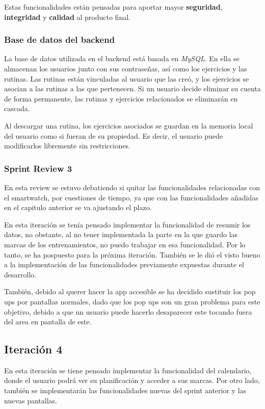 Estas funcionalidades est\'an pensadas para aportar mayor \textbf{seguridad}, \textbf{integridad} y \textbf{calidad} al producto final.

\subsubsection{Base de datos del backend}
La base de datos utilizada en el backend está basada en \textit{MySQL}. En ella se almacenan los usuarios junto con sus contraseñas, así como los ejercicios y las rutinas. Las rutinas están vinculadas al usuario que las creó, y los ejercicios se asocian a las rutinas a las que pertenecen. Si un usuario decide eliminar su cuenta de forma permanente, las rutinas y ejercicios relacionados se eliminarán en cascada.

Al descargar una rutina, los ejercicios asociados se guardan en la memoria local del usuario como si fueran de su propiedad. Es decir, el usuario puede modificarlos libremente sin restricciones.

\subsubsection{Sprint Review 3}

En esta review se estuvo debatiendo si quitar las funcionalidades relacionadas con el smartwatch, por cuestiones de tiempo, ya que con las funcionalidades añadidas en el capitulo anterior se va ajustando el plazo.

En esta iteración se tenía pensado implementar la funcionalidad de resumir los datos, no obstante, al no tener implementada la parte en la que guardo las marcas de los entrenamientos, no puedo trabajar en esa funcionalidad. Por lo tanto, se ha pospuesto para la próxima iteración. También se le dió el visto bueno a la implementación de las funcionalidades previamente expuestas durante el desarrollo.

También, debido al querer hacer la app accesible se ha decidido sustituir los pop ups por pantallas normales, dado que los pop ups son un gran problema para este objetivo, debido a que un usuario puede hacerlo desaparecer este tocando fuera del area en pantalla de este.

\subsection{Iteraci\'on 4}

En esta iteración se tiene pensado implementar la funcionalidad del calendario, donde el usuario podrá ver su planificación y acceder a sus marcas. Por otro lado, también se implementarán las funcionalidades nuevas del sprint anterior y las nuevas pantallas.

